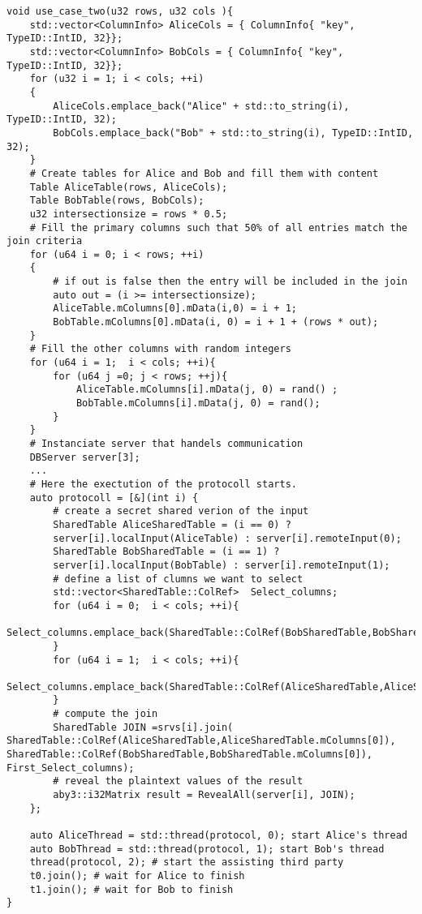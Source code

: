 \begin{lstlisting}[caption={Simpifiyed Protocol for our first use case in ABY3}]
void use_case_two(u32 rows, u32 cols ){
	std::vector<ColumnInfo> AliceCols = { ColumnInfo{ "key", TypeID::IntID, 32}};
	std::vector<ColumnInfo> BobCols = { ColumnInfo{ "key", TypeID::IntID, 32}};
	for (u32 i = 1; i < cols; ++i)
	{
		AliceCols.emplace_back("Alice" + std::to_string(i), TypeID::IntID, 32);
		BobCols.emplace_back("Bob" + std::to_string(i), TypeID::IntID, 32);
	}
	# Create tables for Alice and Bob and fill them with content
	Table AliceTable(rows, AliceCols);
	Table BobTable(rows, BobCols);
	u32 intersectionsize = rows * 0.5;
	# Fill the primary columns such that 50% of all entries match the join criteria 
	for (u64 i = 0; i < rows; ++i)
	{
		# if out is false then the entry will be included in the join
		auto out = (i >= intersectionsize);
		AliceTable.mColumns[0].mData(i,0) = i + 1;
		BobTable.mColumns[0].mData(i, 0) = i + 1 + (rows * out);
	}
	# Fill the other columns with random integers
	for (u64 i = 1;  i < cols; ++i){
		for (u64 j =0; j < rows; ++j){
			AliceTable.mColumns[i].mData(j, 0) = rand() ;
			BobTable.mColumns[i].mData(j, 0) = rand();	
		}
	}
	# Instanciate server that handels communication
	DBServer server[3]; 
	...
	# Here the exectution of the protocoll starts.
	auto protocoll = [&](int i) {
		# create a secret shared verion of the input
		SharedTable AliceSharedTable = (i == 0) ? 
		server[i].localInput(AliceTable) : server[i].remoteInput(0);
		SharedTable BobSharedTable = (i == 1) ?
		server[i].localInput(BobTable) : server[i].remoteInput(1);
		# define a list of clumns we want to select
		std::vector<SharedTable::ColRef>  Select_columns;		
		for (u64 i = 0;  i < cols; ++i){
			Select_columns.emplace_back(SharedTable::ColRef(BobSharedTable,BobSharedTable.mColumns[i]));
		}
		for (u64 i = 1;  i < cols; ++i){
			Select_columns.emplace_back(SharedTable::ColRef(AliceSharedTable,AliceSharedTable.mColumns[i]));
		}
		# compute the join
		SharedTable JOIN =srvs[i].join( SharedTable::ColRef(AliceSharedTable,AliceSharedTable.mColumns[0]), SharedTable::ColRef(BobSharedTable,BobSharedTable.mColumns[0]), First_Select_columns);
		# reveal the plaintext values of the result
		aby3::i32Matrix result = RevealAll(server[i], JOIN); 
	};
	
	auto AliceThread = std::thread(protocol, 0); start Alice's thread
	auto BobThread = std::thread(protocol, 1); start Bob's thread
	thread(protocol, 2); # start the assisting third party
	t0.join(); # wait for Alice to finish
	t1.join(); # wait for Bob to finish
}

\end{lstlisting}
